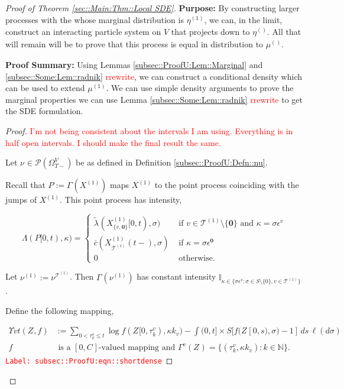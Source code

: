 \documentclass[12pt]{article}
\newcommand{\mb}{\mathbb}
\newcommand{\mc}{\mathcal}
\newcommand{\ov}{\overline}
\newcommand{\te}{\text}
\newcommand{\ep}{\epsilon}
\newcommand{\tr}{\textcolor{red}}
\newcommand{\labe}[1]{\tr{\texttt{Label: #1}}}
\newcommand{\purpose}{\textbf{Purpose: }}
\newcommand{\pfsum}{\textbf{Proof Summary: }}
\newcommand{\ind}{\hspace{24pt}}
\newcommand{\defeq}{:=}								%
\newcommand{\pmsr}{\mc{P}}							%
\renewcommand{\root}{\mathbf{0}}				%
\renewcommand{\v}{v}							%
\renewcommand{\S}{S}							%
\newcommand{\s}{\sigma}							%
\newcommand{\ev}{\ep}							%
\newcommand{\T}{T}								%
\renewcommand{\t}{t}							%
\newcommand{\sset}{\Omega}						%
\renewcommand{\tt}{s}							%
\newcommand{\X}{X}								%
\newcommand{\vind}[1]{^{#1}}					%
\newcommand{\vsi}[1]{^{#1}}						%
\newcommand{\cind}[1]{_{#1}}					%
\newcommand{\tp}[1]{(#1)}						%
\newcommand{\tip}[1]{#1}						%
\newcommand{\ts}[1]{_{#1}}						%
\newcommand{\const}{C}							%
\newcommand{\IGrg}{\ov{c}}						%
\newcommand{\tree}{\mc{T}}						%
\newcommand{\sln}[1]{^{(#1)}}					%
\newcommand{\Sm}{\ell}							%
\newcommand{\alt}[1]{\widetilde{#1}}			%
\newcommand{\indx}[1]{_{#1}}					%
\newcommand{\m}{\mu}							%
\newcommand{\mm}{\nu}							%
\newcommand{\mmm}{\eta}							%
\newcommand{\XXX}{Z}							%
\newcommand{\rt}{\tau}							%
\renewcommand{\it}{k}							%
\newcommand{\pmap}{\Gamma}						%
\renewcommand{\mark}{\kappa}					%
\newcommand{\rp}{P}								%
\newcommand{\ratee}{\Lambda}					%
\newcommand{\crate}{\alt{\lambda}}				%
\newcommand{\ds}{\Upsilon}						%
\begin{document}
\begin{proof}[Proof of Theorem \ref{sec::Main:Thm::Local SDE}]
\purpose By constructing larger processes with the whose marginal distribution is \(\mmm\sln{1}\ts{}\), we can, in the limit, construct an interacting particle system on \(V\) that projects down to \(\mmm\sln{}\ts{}\). All that will remain will be to prove that this process is equal in distribution to \(\m\sln{}\ts{}\).

\pfsum Using Lemmas \ref{subsec::ProofU:Lem::Marginal} and \ref{subsec::Some:Lem::radnik} \tr{rrewrite}, we can construct a conditional density which can be used to extend \(\mu\sln{1}\). We can use simple density arguments to prove the marginal properties we can use Lemma \ref{subsec::Some:Lem::radnik} \tr{rrewrite} to get the SDE formulation.

\begin{proof}
\tr{I'm not being consistent about the intervals I am using. Everything is in half open intervals. I should make the final result the same.}

Let \(\mm\vind{}\ts{} \in \pmsr(\sset\vsi{V}\ts{\T-})\) be as defined in Definition \ref{subsec::ProofU:Defn::nu}.

\ind Recall that \(\rp \defeq \pmap\vind{}(\X\sln{1}\cind{}\tip{})\) maps \(\X\sln{1}\cind{}\tip{}\) to the point process coinciding with the jumps of \(\X\sln{1}\cind{}\tip{}\). This point process has intensity,

\[\ratee(\rp[0,\t),\mark{}) = \begin{cases}
\crate\vind{}\ts{}(\X\sln{1}\cind{\{\v,\root\}}\tip{[0,\t)},\s) &\te{ if } \v\in \tree\sln{1}\setminus\{\root\}\te{ and } \mark{} = \s\ev\vind{\v}\\
\IGrg{}(\X\sln{1}\cind{\tree\sln{1}}\tp{\t-},\s) &\te{ if } \mark{} = \s\ev\vind{\root}\\
0 &\te{ otherwise}.
\end{cases}\]

Let \(\mm\sln{1}\ts{} \defeq \mm\vind{\tree\sln{1}}\ts{}\). Then \(\pmap\vind{}(\mm\sln{1}\ts{})\) has constant intensity \(\mb{I}_{\kappa \in\{\s\ev\vind{\v}:\s\in\S\setminus\{0\},\v\in\tree\sln{1}\}}\). 

\ind Define the following mapping,

\begin{align}
\ds{\v}{\t}(\XXX\cind{}\tip{},f) &\defeq \sum_{0 < \rt\indx{\it}\vind{\v} \leq \t} \log{f(\XXX\cind{}\tip{[0,\rt\indx{\it}\vind{\v})},\mark{\it}_\v)} - \int{(0,\t]\times \S} [f(\XXX\cind{}\tip{[0,\tt)},\s) - 1]\,ds\,\Sm(d\s) \label{subsec::ProofU:eqn::shortdense}\\
f&\te{ is a }[0,\const\indx{}] \te{-valued mapping and } \pmap\vind{\v}(\XXX\cind{}\tip{}) = \{(\rt\indx{\it}\vind{\v},\mark{\it}_\v):\it\in\mb{N}\}.\nonumber
\end{align} 
\labe{subsec::ProofU:eqn::shortdense}


\end{proof}
\end{proof}
\end{document}
